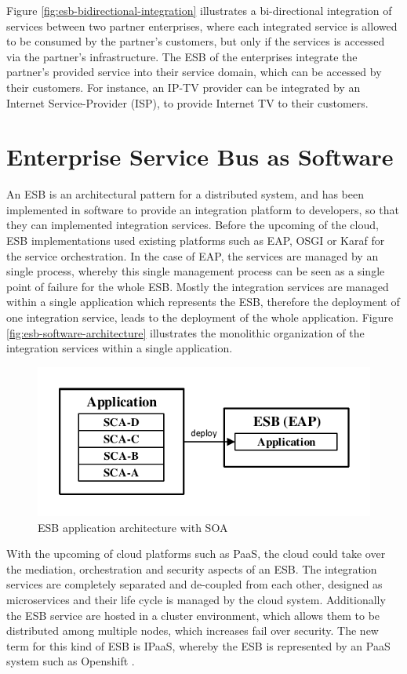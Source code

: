 Figure \vref{fig:esb-bidirectional-integration} illustrates a bi-directional integration of services between two partner enterprises, where each integrated service is allowed to be consumed by the partner's customers, but only if the services is accessed via the partner's infrastructure. The ESB of the enterprises integrate the partner's provided service into their service domain, which can be accessed by their customers. For instance, an IP-TV provider can be integrated by an Internet Service-Provider (ISP), to provide Internet TV to their customers. 

\section{Enterprise Service Bus as Software}
\label{sec:esb-as-software}
An ESB is an architectural pattern for a distributed system, and has been implemented in software to provide an integration platform to developers, so that they can implemented integration services. Before the upcoming of the cloud, ESB implementations used existing platforms such as EAP, OSGI or Karaf for the service orchestration. In the case of EAP, the services are managed by an single process, whereby this single management process can be seen as a single point of failure for the whole ESB. Mostly the integration services are managed within a single application which represents the ESB, therefore the deployment of one integration service, leads to the deployment of the whole application. Figure \vref{fig:esb-software-architecture} illustrates the monolithic organization of the integration services within a single application.
\begin{figure}[htbp]
	\centering
	\includegraphics[scale=1]{images/esb-software-architecture.pdf}
	\caption{ESB application architecture with SOA}
	\label{fig:esb-software-architecture}
\end{figure} 

With the upcoming of cloud platforms such as PaaS, the cloud could take over the mediation, orchestration and security aspects of an ESB. The integration services are completely separated and de-coupled from each other, designed as microservices and their life cycle is managed by the cloud system. Additionally the ESB service are hosted in a cluster environment, which allows them to be distributed among multiple nodes, which increases fail over security. The new term for this kind of ESB is IPaaS, whereby the ESB is represented by an PaaS system such as Openshift \cite{iPaaSP12015, iPaaSP22015}.

